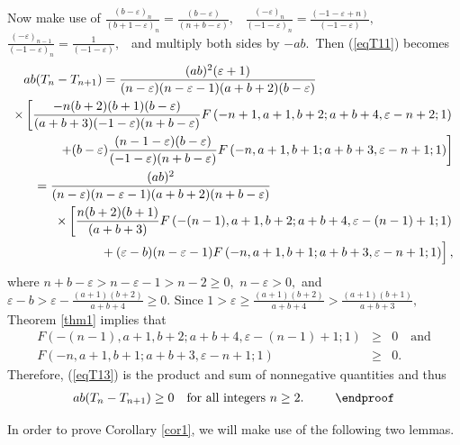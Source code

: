 \documentclass[final,oneeqnum]{siamltex}
\begin{document}
\noindent Now make use of
$\frac{(b-\varepsilon)_{n}}{(b+1-\varepsilon)_{n}}=
\frac{(b-\varepsilon)}{(n+ b-\varepsilon)},$ \
$\frac{(-\varepsilon)_{n}}{(-1-\varepsilon)_{n}}=
\frac{(-1-\varepsilon+n)}{(-1-\varepsilon)},$ \
$\frac{(-\varepsilon)_{n-1}}{(-1-\varepsilon)_{n}}=
\frac{1}{(-1-\varepsilon)},$ \ and multiply both sides by
$-ab$.\ Then (\ref{eqT11}) becomes
 \begin{eqnarray} 
\hspace*{-1.1in}a b (T_{n} - T_{n+1})  = \frac{(a
b)^2(\varepsilon+1)}{(n-\varepsilon)(n-\varepsilon-1)(a+b+2)(b-\varepsilon)}
\hspace*{1.5in} \nonumber\\  
\times\left[\frac{-n(b+2)(b+1)(b-\varepsilon)}{(a+b+3)(-1-\varepsilon)(n+
b-\varepsilon)}
F\left(-n+1,a+1,b+2;a+b+4,\varepsilon-n+2 ;1\right) \right.\nonumber\\ 
\left.\ +(b-\varepsilon)\frac{(n-1-\varepsilon)(b-\varepsilon)}{(-1-\varepsilon)(n+b-
\varepsilon)}F\left(-n,a+1,b+1;a+b+3,\varepsilon-n+1;1\right)\right]
\nonumber \\
= \frac{(ab)^2}{(n-\varepsilon)(n-\varepsilon-1)(a+b+2)(n+ b-\varepsilon)}\hspace*{2.0in} 
\nonumber\\  
\times\left[\frac{n(b+2)(b+1)}{(a+b+3)}
F\left(-(n-1),a+1,b+2;a+b+4,\varepsilon-(n-1)+1 ;1\right) 
\right.\nonumber\\ 
\left.\ \frac{}{}+(\varepsilon-b)(n-\varepsilon-1)F\left(-n,a+1,b+1;a+b+3,\varepsilon-n+
1;1\right)\right],
\label{eqT13}
\end{eqnarray} 
where  $n+ b-\varepsilon > n-\varepsilon-1>n-2 \geq 0,$
$n-\varepsilon >0,$ and $\varepsilon-b>
\varepsilon-\frac{(a+1)(b+2)}{a+b+4} \geq 0$.
 Since $1> \varepsilon \geq
\frac{(a+1)(b+2)}{a+b+4}>\frac{(a+1)(b+1)}{a+b+3},$
Theorem \ref{thm1} implies that
\begin{eqnarray}
 F\left(-(n-1),a+1,b+2;a+b+4,\varepsilon-(n-1)+1 ;1\right)
&\geq& 0 \quad \mbox{and}  \nonumber \\
F\left(-n,a+1,b+1;a+b+3,\varepsilon-n+1;1\right) &\geq& 0.\  \nonumber
\end{eqnarray}  
Therefore, (\ref{eqT13}) is the product and sum of
nonnegative quantities and thus
\begin{eqnarray} 
a b (T_{n} - T_{n+1}) \geq 0 \quad \mbox{for all integers }
n\geq 2.\ \nonumber \, \qquad\endproof %
\end{eqnarray}

\noindent In order to prove Corollary \ref{cor1}, we will make use of the following
two lemmas.
\end{document}

